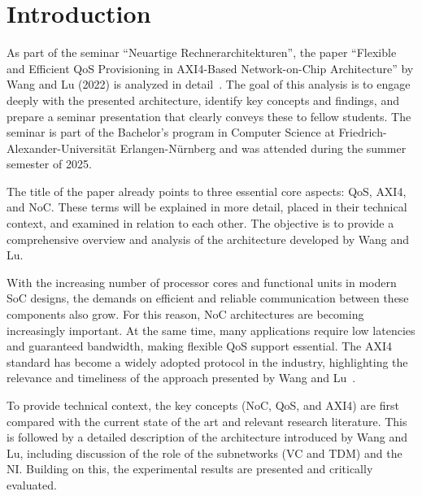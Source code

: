 \chapter{Introduction}

As part of the seminar “Neuartige Rechnerarchitekturen”, the paper “Flexible and Efficient QoS Provisioning in AXI4-Based Network-on-Chip Architecture” by Wang and Lu (2022) is analyzed in detail~\cite{wang_flexible_2022}. The goal of this analysis is to engage deeply with the presented architecture, identify key concepts and findings, and prepare a seminar presentation that clearly conveys these to fellow students.
The seminar is part of the Bachelor's program in Computer Science at Friedrich-Alexander-Universität Erlangen-Nürnberg and was attended during the summer semester of 2025.

The title of the paper already points to three essential core aspects: \ac{QoS}, \ac{AXI4}, and \ac{NoC}. These terms will be explained in more detail, placed in their technical context, and examined in relation to each other. The objective is to provide a comprehensive overview and analysis of the architecture developed by Wang and Lu.

With the increasing number of processor cores and functional units in modern \ac{SoC} designs, the demands on efficient and reliable communication between these components also grow. For this reason, NoC architectures are becoming increasingly important. At the same time, many applications require low latencies and guaranteed bandwidth, making flexible QoS support essential. The AXI4 standard has become a widely adopted protocol in the industry, highlighting the relevance and timeliness of the approach presented by Wang and Lu~\cite{jake_ke_demystifying_2025, gomez-rodriguez_survey_2021, talwar_traffic_2013}.

To provide technical context, the key concepts (\acs{NoC}, \acs{QoS}, and \acs{AXI4}) are first compared with the current state of the art and relevant research literature. This is followed by a detailed description of the architecture introduced by Wang and Lu, including discussion of the role of the subnetworks (\ac{VC} and \ac{TDM}) and the \ac{NI}. Building on this, the experimental results are presented and critically evaluated.
